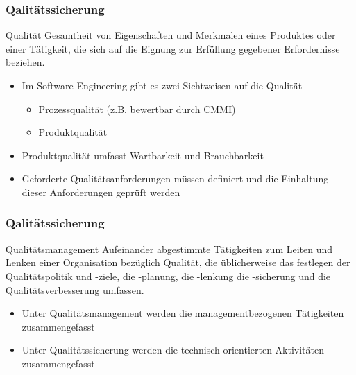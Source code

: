 \begin{frame}
\frametitle{Qalitätssicherung}
	\begin{block}{Qualität}
		Gesamtheit von Eigenschaften und Merkmalen eines Produktes oder einer Tätigkeit,
		die sich auf die Eignung zur Erfüllung gegebener Erfordernisse beziehen.
	\end{block}
	\begin{itemize}
		\item Im Software Engineering gibt es zwei Sichtweisen auf die Qualität
		\begin{itemize}
			\item Prozessqualität (z.B. bewertbar durch CMMI)
			\item Produktqualität
		\end{itemize}
		\item Produktqualität umfasst Wartbarkeit und Brauchbarkeit
		\item Geforderte Qualitätsanforderungen müssen definiert und die Einhaltung
					dieser Anforderungen geprüft werden
	\end{itemize}
\end{frame}

\begin{frame}
\frametitle{Qalitätssicherung}
	\begin{block}{Qualitätsmanagement}
		Aufeinander abgestimmte Tätigkeiten zum Leiten und Lenken einer Organisation
		bezüglich Qualität, die üblicherweise das festlegen der Qualitätspolitik und
		-ziele, die -planung, die -lenkung die -sicherung und die Qualitätsverbesserung
		umfassen.
	\end{block}
	\begin{itemize}
		\item Unter Qualitätsmanagement werden die managementbezogenen Tätigkeiten zusammengefasst
		\item Unter Qualitätssicherung werden die technisch orientierten Aktivitäten zusammengefasst
	\end{itemize}
\end{frame}

